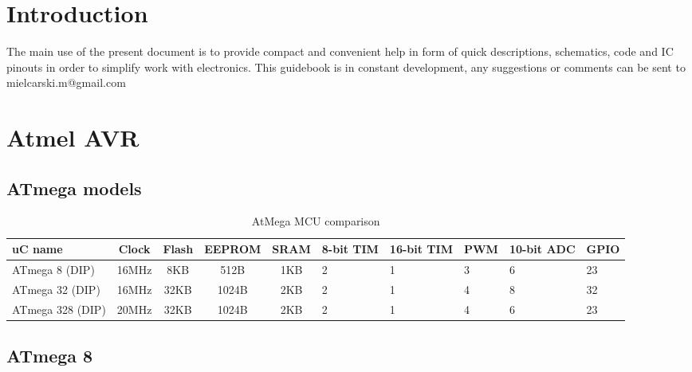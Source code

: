 \documentclass{article}
\begin{document}

  \newpage
{}  

\section{Introduction}
The main use of the present document is to provide compact and convenient help in form of quick descriptions, schematics, code and IC pinouts in order to simplify work with electronics. This guidebook is in constant development, any suggestions or comments can be sent to mielcarski.m@gmail.com

\section{Atmel AVR}
\subsection{ATmega models}
\begin{table}[H]
\centering
\caption{AtMega MCU comparison} 
\label{ATmega comparison}
\begin{tabular}{|l|c|c|c|c|m{1cm}|m{1cm}|m{1cm}|m{1cm}|m{1cm}|}
  \hline 
  uC name & Clock & Flash & EEPROM & SRAM & 8-bit TIM & 16-bit TIM & PWM & 10-bit ADC & GPIO \\
  \hline 
  ATmega 8 (DIP)& 16MHz & 8KB & 512B & 1KB & 2 & 1 & 3 & 6 & 23 \\
  \hline
  ATmega 32 (DIP) & 16MHz & 32KB & 1024B & 2KB & 2 & 1 & 4 & 8 & 32 \\
  \hline
  ATmega 328 (DIP) & 20MHz & 32KB & 1024B & 2KB & 2 & 1 & 4 & 6 & 23 \\
  \hline
\end{tabular} 
\end{table}

\newpage
\subsection{ATmega 8}
\end{document}
